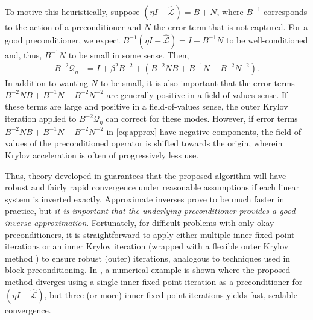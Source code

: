 \documentclass[review]{siamart}
\begin{document}
To motive this heuristically, suppose $(\eta I - \widehat{\mathcal{L}}) = B + N$,
where $B^{-1}$ corresponds to the action of a preconditioner and $N$ the error
term that is not captured. For a good preconditioner, we expect
$B^{-1}(\eta I - \widehat{\mathcal{L}}) = I+B^{-1}N$ to be
well-conditioned and, thus, $B^{-1}N$ to be small in some sense. Then,
%
\begin{align}\nonumber
B^{-2}\mathcal{Q}_\eta & = I + \beta^2B^{-2} + \left(B^{-2}NB + B^{-1}N + B^{-2}N^{-2}\right)\label{eq:approx}.
\end{align}
%
In addition to wanting $N$ to be small, it is also important that the error terms
$B^{-2}NB + B^{-1}N + B^{-2}N^{-2}$ are generally positive in a field-of-values sense.
If these terms are large and positive in a field-of-values sense, the outer Krylov
iteration applied to $B^{-2}\mathcal{Q}_\eta$ can correct for these modes. However,
if error terms $B^{-2}NB + B^{-1}N + B^{-2}N^{-2}$ in \eqref{eq:approx} have 
negative components, the field-of-values of the preconditioned operator is shifted
towards the origin, wherein Krylov acceleration is often of progressively less use. 

Thus, theory developed in  guarantees that the proposed algorithm
will have robust and fairly rapid convergence under reasonable assumptions if each
linear system is inverted exactly. Approximate inverses prove to be much faster in
practice, but \textit{it is important that the underlying preconditioner provides a good
inverse approximation}. Fortunately, for difficult problems with only okay preconditioners,
it is straightforward to apply either multiple inner fixed-point iterations or an
inner Krylov iteration (wrapped with a flexible outer Krylov method
\cite{notay2000flexible,saad1993flexible}) to ensure robust (outer) iterations, analogous
to techniques used in block preconditioning. In , a
numerical example is shown where the proposed method diverges using a single inner
fixed-point iteration as a preconditioner for $(\eta I - \widehat{\mathcal{L}})$, but
three (or more) inner fixed-point iterations yields fast, scalable convergence.
\end{document}
